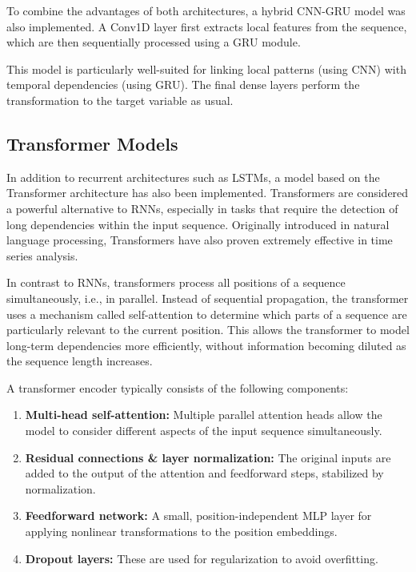 To combine the advantages of both architectures, a hybrid CNN-GRU model was also implemented. A Conv1D layer first extracts local features from the sequence, which are then sequentially processed using a GRU module.

This model is particularly well-suited for linking local patterns (using CNN) with temporal dependencies (using GRU). The final dense layers perform the transformation to the target variable as usual.



\subsection{Transformer Models}

In addition to recurrent architectures such as LSTMs, a model based on the Transformer architecture has also been implemented. Transformers are considered a powerful alternative to RNNs, especially in tasks that require the detection of long dependencies within the input sequence. Originally introduced in natural language processing, Transformers have also proven extremely effective in time series analysis.

In contrast to RNNs, transformers process all positions of a sequence simultaneously, i.e., in parallel. Instead of sequential propagation, the transformer uses a mechanism called self-attention to determine which parts of a sequence are particularly relevant to the current position. This allows the transformer to model long-term dependencies more efficiently, without information becoming diluted as the sequence length increases.

A transformer encoder typically consists of the following components:

\begin{enumerate}
    \item \textbf{Multi-head self-attention:} Multiple parallel attention heads allow the model to consider different aspects of the input sequence simultaneously.

    \item \textbf{Residual connections \& layer normalization:} The original inputs are added to the output of the attention and feedforward steps, stabilized by normalization.

    \item \textbf{Feedforward network:} A small, position-independent MLP layer for applying nonlinear transformations to the position embeddings.

    \item \textbf{Dropout layers:} These are used for regularization to avoid overfitting.
\end{enumerate}

